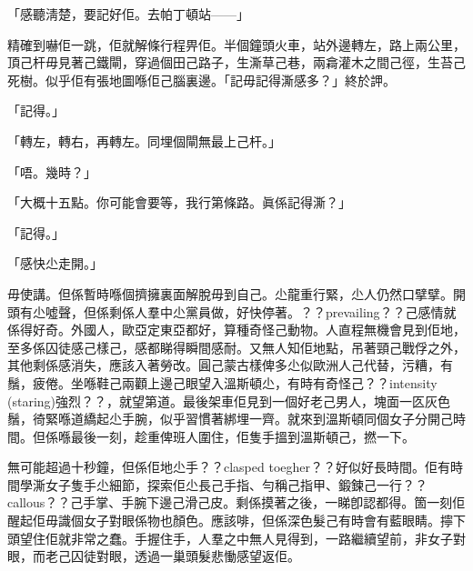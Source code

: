「感聽淸楚，要記好佢。去帕丁頓站——」

精確到嚇佢一跳，佢就解條行程畀佢。半個鐘頭火車，站外邊轉左，路上兩公里，頂己杆毋見著己鐵閘，穿過個田己路子，生澌草己巷，兩樖灌木之間己徑，生苔己死樹。似乎佢有張地圖喺佢己腦裏邊。「記毋記得澌感多？」終於䛅。

「記得。」

「轉左，轉右，再轉左。同埋個閘無最上己杆。」

 「唔。幾時？」

「大概十五點。你可能會要等，我行第條路。眞係記得澌？」

「記得。」

「感快尐走開。」

毋使講。但係暫時喺個擠擁裏面解脫毋到自己。尐龍重行緊，尐人仍然口擘擘。開頭有尐噓聲，但係剩係人羣中尐黨員做，好快停著。？？prevailing？？己感情就係得好奇。外國人，歐亞定東亞都好，算種奇怪己動物。人直程無機會見到佢地，至多係囚徒感己樣己，感都睇得瞬間感耐。又無人知佢地點，吊著頸己戰俘之外，其他剩係感消失，應該入著勞改。圓己蒙古樣俾多尐似歐洲人己代替，污糟，有鬚，疲倦。坐喺鞋己兩顴上邊己眼望入溫斯頓尐，有時有奇怪己？？intensity (staring)強烈？？，就望第道。最後架車佢見到一個好老己男人，塊面一匛灰色鬚，徛緊喺道繑起尐手腕，似乎習慣著綁埋一齊。就來到溫斯頓同個女子分開己時間。但係喺最後一刻，趁重俾班人圍住，佢隻手搵到溫斯頓己，撚一下。

無可能超過十秒鐘，但係佢地尐手？？clasped toegher？？好似好長時間。佢有時間學澌女子隻手尐細節，探索佢尐長己手指、勻稱己指甲、鍛鍊己一行？？callous？？己手掌、手腕下邊己滑己皮。剩係摸著之後，一睇卽認都得。箇一刻佢醒起佢毋識個女子對眼係物也顏色。應該啡，但係深色髮己有時會有藍眼睛。擰下頭望住佢就非常之蠢。手握住手，人羣之中無人見得到，一路繼續望前，非女子對眼，而老己囚徒對眼，透過一巢頭髮悲慟感望返佢。
